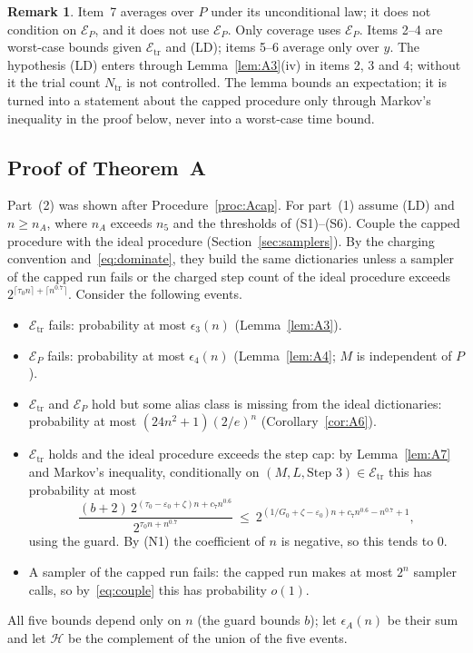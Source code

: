 \documentclass[11pt]{article}
\theoremstyle{definition}
\newtheorem{remark}[lemma]{Remark}
\newcommand{\eps}{\varepsilon}
\newcommand{\ceil}[1]{\lceil #1\rceil}
\newcommand{\cE}{\mathcal E}
\newcommand{\Ntr}{N_{\mathrm{tr}}}
\begin{document}
\begin{remark}\label{rem:A7}
Item~7 averages over $P$ under its unconditional law; it does not condition on $\cE_P$, and it does not use
$\cE_P$. Only coverage uses $\cE_P$. Items 2--4 are worst-case bounds given $\cE_{\mathrm{tr}}$ and
\textup{(LD)}; items 5--6 average only over $y$. The hypothesis \textup{(LD)} enters through
Lemma~\ref{lem:A3}(iv) in items 2, 3 and 4; without it the trial count $\Ntr$ is not controlled. The lemma bounds an
expectation; it is turned into a statement about the capped procedure only through Markov's inequality in the
proof below, never into a worst-case time bound.
\end{remark}

\subsection{Proof of Theorem~A}\label{sec:thmA}
Part~(2) was shown after Procedure~\ref{proc:Acap}. For part~(1) assume \textup{(LD)} and $n\ge n_A$, where $n_A$
exceeds $n_5$ and the thresholds of \textup{(S1)--(S6)}. Couple the capped procedure with the ideal procedure
(Section~\ref{sec:samplers}). By the charging convention and~\eqref{eq:dominate}, they build the same dictionaries
unless a sampler of the capped run fails or the charged step count of the ideal procedure exceeds
$2^{\ceil{\tau_0n}+\ceil{n^{0.7}}}$. Consider the following events.
\begin{itemize}
\item $\cE_{\mathrm{tr}}$ fails: probability at most $\epsilon_3(n)$ (Lemma~\ref{lem:A3}).
\item $\cE_P$ fails: probability at most $\epsilon_4(n)$ (Lemma~\ref{lem:A4}; $M$ is independent of $P$).
\item $\cE_{\mathrm{tr}}$ and $\cE_P$ hold but some alias class is missing from the ideal dictionaries:
probability at most $(24n^2+1)(2/e)^n$ (Corollary~\ref{cor:A6}).
\item $\cE_{\mathrm{tr}}$ holds and the ideal procedure exceeds the step cap: by Lemma~\ref{lem:A7} and Markov's
inequality, conditionally on $(M,L,\text{Step 3})\in\cE_{\mathrm{tr}}$ this has probability at most
\[
 \frac{(b+2)\,2^{(\tau_0-\eps_0+\zeta)n+c_7n^{0.6}}}{2^{\tau_0n+n^{0.7}}}\ \le\ 2^{(1/G_0+\zeta-\eps_0)n+c_7n^{0.6}-n^{0.7}+1},
\]
using the guard. By \textup{(N1)} the coefficient of $n$ is negative, so this tends to $0$.
\item A sampler of the capped run fails: the capped run makes at most $2^{n}$ sampler calls, so by~\eqref{eq:couple}
this has probability $o(1)$.
\end{itemize}
All five bounds depend only on $n$ (the guard bounds $b$); let $\epsilon_A(n)$ be their sum and let $\mathcal H$
be the complement of the union of the five events.
\end{document}
